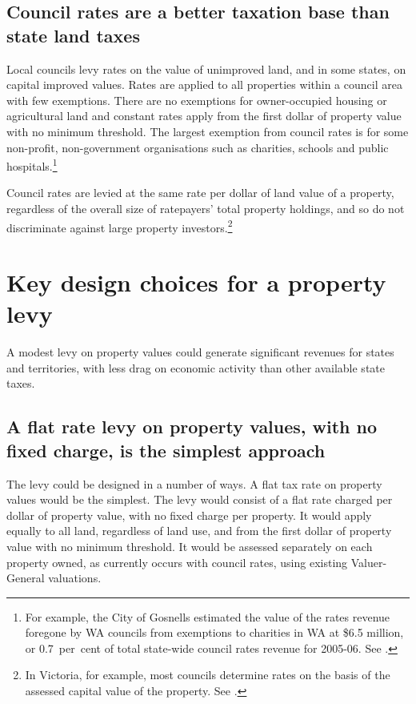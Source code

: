 \documentclass[twoside,english]{palatinob5ona4portrait}
\begin{document}
\section{\label{sec:PROP-5-2}Council rates are a better taxation base than state land taxes}
Local councils levy rates on the value of unimproved land, and in some states, on capital improved values. Rates are applied to all properties within a council area with few exemptions. There are no exemptions for owner-occupied housing or agricultural land and constant rates apply from the first dollar of property value with no minimum threshold. The largest exemption from council rates is for some non-profit, non-government organisations such as charities, schools and public hospitals.\footnote{For example, the City of Gosnells estimated the value of the rates revenue foregone by WA councils from exemptions to charities in WA at \$6.5 million, or 0.7~per~cent of total state-wide council rates revenue for 2005-06. See \textcite[][107]{productivity2008assessing}.}

Council rates are levied at the same rate per dollar of land value of a property, regardless of the overall size of ratepayers’ total property holdings, and so do not discriminate against large property investors.\footnote{In Victoria, for example, most councils determine rates on the basis of the assessed capital value of the property. See \textcite[][154]{HefferanBoyd2010}.}  

\chapter{Key design choices for a property levy}
A modest levy on property values could generate significant revenues for states and territories, with less drag on economic activity than other available state taxes.

\section{A flat rate levy on property values, with no fixed charge, is the simplest approach\label{sec:PROP-6-1}}
The levy could be designed in a number of ways. A flat tax rate on property values would be the simplest. The levy would consist of a flat rate charged per dollar of property value, with no fixed charge per property. It would apply equally to all land, regardless of land use, and from the first dollar of property value with no minimum threshold. It would be assessed separately on each property owned, as currently occurs with council rates, using existing Valuer-General valuations. 
\end{document}
